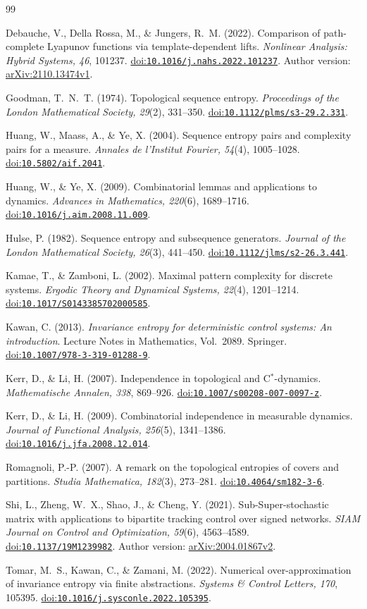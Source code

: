 \documentclass[11pt,reqno]{amsart}
\numberwithin{equation}{section}
\theoremstyle{definition}
\newcommand{\doi}[1]{\href{https://doi.org/#1}{doi:\nolinkurl{#1}}}
\begin{document}
\begin{thebibliography}{99}

Debauche, V., Della Rossa, M., \& Jungers, R.~M. (2022).
Comparison of path-complete Lyapunov functions via template-dependent lifts.
\emph{Nonlinear Analysis: Hybrid Systems, 46}, 101237.
\doi{10.1016/j.nahs.2022.101237}.
Author version: \href{https://arxiv.org/abs/2110.13474v1}{arXiv:2110.13474v1}.

Goodman, T.~N.~T. (1974). Topological sequence entropy.
\emph{Proceedings of the London Mathematical Society, 29}(2), 331--350.
\doi{10.1112/plms/s3-29.2.331}.

Huang, W., Maass, A., \& Ye, X. (2004).
Sequence entropy pairs and complexity pairs for a measure.
\emph{Annales de l'Institut Fourier, 54}(4), 1005--1028.
\doi{10.5802/aif.2041}.

Huang, W., \& Ye, X. (2009).
Combinatorial lemmas and applications to dynamics.
\emph{Advances in Mathematics, 220}(6), 1689--1716.
\doi{10.1016/j.aim.2008.11.009}.

Hulse, P. (1982). Sequence entropy and subsequence generators.
\emph{Journal of the London Mathematical Society, 26}(3), 441--450.
\doi{10.1112/jlms/s2-26.3.441}.

Kamae, T., \& Zamboni, L. (2002).
Maximal pattern complexity for discrete systems.
\emph{Ergodic Theory and Dynamical Systems, 22}(4), 1201--1214.
\doi{10.1017/S0143385702000585}.

Kawan, C. (2013).
\emph{Invariance entropy for deterministic control systems:
An introduction}. Lecture Notes in Mathematics, Vol.~2089.
Springer. \doi{10.1007/978-3-319-01288-9}.

Kerr, D., \& Li, H. (2007).
Independence in topological and C$^*$-dynamics.
\emph{Mathematische Annalen, 338}, 869--926.
\doi{10.1007/s00208-007-0097-z}.

Kerr, D., \& Li, H. (2009).
Combinatorial independence in measurable dynamics.
\emph{Journal of Functional Analysis, 256}(5), 1341--1386.
\doi{10.1016/j.jfa.2008.12.014}.

Romagnoli, P.-P. (2007).
A remark on the topological entropies of covers and partitions.
\emph{Studia Mathematica, 182}(3), 273--281.
\doi{10.4064/sm182-3-6}.

Shi, L., Zheng, W.~X., Shao, J., \& Cheng, Y. (2021).
Sub-Super-stochastic matrix with applications to bipartite tracking
control over signed networks.
\emph{SIAM Journal on Control and Optimization, 59}(6), 4563--4589.
\doi{10.1137/19M1239982}.
Author version: \href{https://arxiv.org/abs/2004.01867v2}{arXiv:2004.01867v2}.

Tomar, M.~S., Kawan, C., \& Zamani, M. (2022).
Numerical over-approximation of invariance entropy via finite abstractions.
\emph{Systems \& Control Letters, 170}, 105395.
\doi{10.1016/j.sysconle.2022.105395}.

\end{thebibliography}
\end{document}
